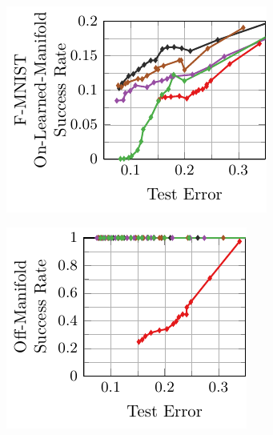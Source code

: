 \begin{appendix}
\begin{figure}
\begin{subfigure}{0.245\textwidth}
        \centering
        \includegraphics[width=\textwidth]{appendix_resnet_fashion_error_on_learned.pdf}
    \end{subfigure}
    \begin{subfigure}{0.225\textwidth}
        \centering
        \includegraphics[width=\textwidth]{appendix_resnet_fashion_error_off.pdf}
    \end{subfigure}
    \\
    \begin{subfigure}{0.245\textwidth}
        \centering

\end{subfigure}
\end{figure}
\end{appendix}
